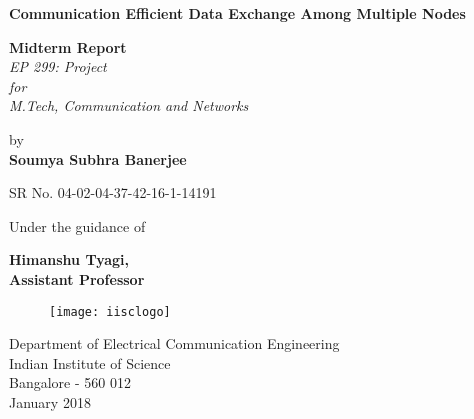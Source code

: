 \documentclass[
11pt, %
a4paper, %
oneside, %
headinclude,footinclude, %
BCOR5mm, %
]{scrartcl}
\begin{document}
\begin{titlepage}
\begin{center}
\begin{huge}
\vspace{1 in}
{\bf  Communication Efficient Data Exchange Among Multiple Nodes}\\  
\end{huge}
\vspace{0.5 in}
\begin{large}
\textbf{Midterm Report}\\
\textit{EP 299: Project \\for\\
M.Tech, Communication and Networks\\}
\end{large}
\begin{large}
\vspace{0.5cm}
{by\\}
\vspace{0.1cm}
{\bf Soumya Subhra Banerjee\\}
\end{large}
SR No. 04-02-04-37-42-16-1-14191\\
\vspace{.5in}

\begin{large}
{ Under the guidance of}\\
\end{large}
\vspace{0.2cm}
\begin{large}
{\bf Himanshu Tyagi,\\Assistant Professor}\end{large}
\vspace{1.0cm}

\begin{figure}[h]
\begin{center}

\texttt{[image: iisclogo]}
\end{center}
\end{figure}

\begin{large}
{ Department of Electrical Communication Engineering\\
Indian Institute of Science\\Bangalore - 560 012}\\
January 2018
\end{large}

\end{center}
\end{titlepage}
\end{document}
